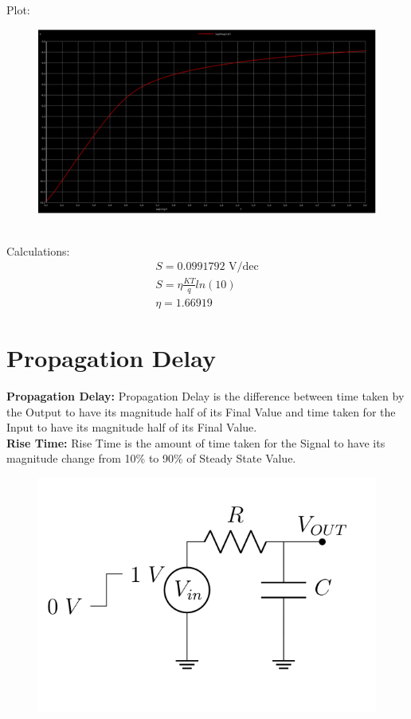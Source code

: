\documentclass{article}
\begin{document}
Plot:\\
\begin{figure}[!ht]
    \centering
    \includegraphics[scale=0.25]{Images/4dpmoss.png}
\end{figure}\\
Calculations:
\begin{align}
    S = 0.0991792 \text{ V/dec} \\
    S = \eta \frac{KT}{q} ln(10) \\
    \eta = 1.66919
\end{align}

\section{Propagation Delay}
\textbf{Propagation Delay:} Propagation Delay is the difference between time taken by the Output to have its magnitude half of its Final Value and time taken for the Input to have its magnitude half of its Final Value.\\ 
\textbf{Rise Time:} Rise Time is the amount of time taken for the Signal to have its magnitude change from 10\% to 90\% of Steady State Value.\\
\begin{figure}[!ht]
    \centering
    \includegraphics[scale=0.35]{Images/5.png}
\end{figure}
\end{document}
